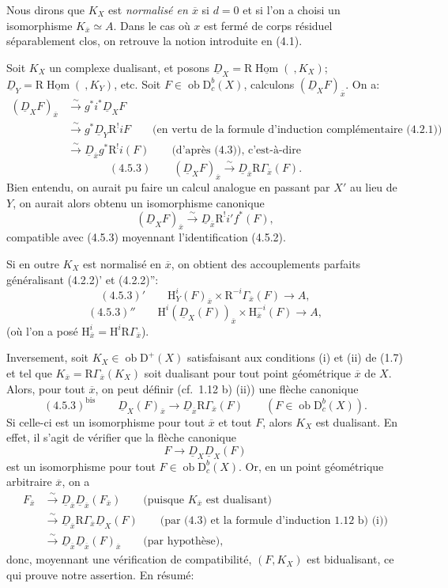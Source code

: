 \documentclass[11pt]{article}
\renewcommand{\H}{\mathrm{H}}
\DeclareMathOperator{\Hom}{Hom}
\newcommand{\R}{\mathrm{R}}
\newcommand{\D}{\mathrm{D}}
\newcommand{\ob}{\operatorname{ob}}
\newcommand{\ol}[1]{\overline{#1}}
\providecommand{\Hom}{\operatorname{Hom}}
\providecommand{\ob}{\operatorname{ob}}
\providecommand{\R}{\mathrm R}
\providecommand{\Hom}{\operatorname{Hom}}
\begin{document}
Nous dirons que $K_X$ est \emph{normalisé en $\ol{x}$} si $d=0$ et si l'on a choisi un isomorphisme $K_{\ol{x}}\simeq A$. Dans le cas où $x$ est fermé de corps résiduel séparablement clos, on retrouve la notion introduite en (4.1).

Soit $K_X$ un complexe dualisant, et posons $\underline{D}_X=\R\underline{\Hom}(\ ,K_X)$; $\underline{D}_Y=\R\underline{\Hom}(\ ,K_Y)$, etc. Soit $F\in\ob\D_c^b(X)$, calculons $(\underline{D}_XF)_{\ol{x}}$. On a:
\[
\begin{aligned}
(\underline{D}_XF)_{\ol{x}}&\xrightarrow{\sim}g^*i^*\underline{D}_X F\\
&\xrightarrow{\sim}g^*\underline{D}_Y\R^{!}iF\qquad\text{(en vertu de la formule d'induction complémentaire (4.2.1))}\\
&\xrightarrow{\sim}\underline{D}_{\ol{x}}g^*\R^{!}i(F)\qquad\text{(d'après (4.3)), c'est-à-dire}
\end{aligned}
\]
\[
(4.5.3)\qquad (\underline{D}_X F)_{\ol{x}}\xrightarrow{\sim}\underline{D}_{\ol{x}}\R\Gamma_{\ol{x}}(F).
\]
Bien entendu, on aurait pu faire un calcul analogue en passant par $X'$ au lieu de $Y$, on aurait alors obtenu un isomorphisme canonique
\[
(\underline{D}_XF)_{\ol{x}}\xrightarrow{\sim}\underline{D}_{\ol{x}}\R^{!}i'f^*(F),
\]
compatible avec (4.5.3) moyennant l'identification (4.5.2).

Si en outre $K_X$ est normalisé en $\ol{x}$, on obtient des accouplements parfaits généralisant (4.2.2)' et (4.2.2)'':
\[
(4.5.3)'\qquad \H_Y^i(F)_{\ol{x}}\times \R^{-i}\Gamma_{\ol{x}}(F)\longrightarrow A,
\]
\[
(4.5.3)''\qquad \H^i(\underline{D}_X(F))_{\ol{x}}\times \H_{\ol{x}}^{-i}(F)\longrightarrow A,
\]
(où l'on a posé $\H_{\ol{x}}^i=\H^i\R\Gamma_{\ol{x}}$).

Inversement, soit $K_X\in\ob\D^+(X)$ satisfaisant aux conditions (i) et (ii) de (1.7) et tel que $K_{\ol{x}}=\R\Gamma_{\ol{x}}(K_X)$ soit dualisant pour tout point géométrique $\ol{x}$ de $X$. Alors, pour tout $\ol{x}$, on peut définir (cf.~1.12 b) (ii)) une flèche canonique
\[
(4.5.3)^{\mathrm{bis}}\qquad \underline{D}_X(F)_{\ol{x}}\longrightarrow \underline{D}_{\ol{x}}\R\Gamma_{\ol{x}}(F)\qquad (F\in\ob\D_c^b(X)).
\]
Si celle-ci est un isomorphisme pour tout $\ol{x}$ et tout $F$, alors $K_X$ est dualisant. En effet, il s'agit de vérifier que la flèche canonique
\[
F\longrightarrow \underline{D}_X\underline{D}_X(F)
\]
est un isomorphisme pour tout $F\in\ob\D_c^b(X)$. Or, en un point géométrique arbitraire $\ol{x}$, on a
\[
\begin{aligned}
F_{\ol{x}}&\xrightarrow{\sim}\underline{D}_{\ol{x}}\underline{D}_{\ol{x}}(F_{\ol{x}})\qquad\text{(puisque $K_{\ol{x}}$ est dualisant)}\\
&\xrightarrow{\sim}\underline{D}_{\ol{x}}\R\Gamma_{\ol{x}}\underline{D}_X(F)\qquad\text{(par (4.3) et la formule d'induction 1.12 b) (i))}\\
&\xrightarrow{\sim}\underline{D}_{\ol{x}}\underline{D}_{\ol{x}}(F)_{\ol{x}}\qquad\text{(par hypothèse)},
\end{aligned}
\]
donc, moyennant une vérification de compatibilité, $(F,K_X)$ est bidualisant, ce qui prouve notre assertion. En résumé:
\end{document}
